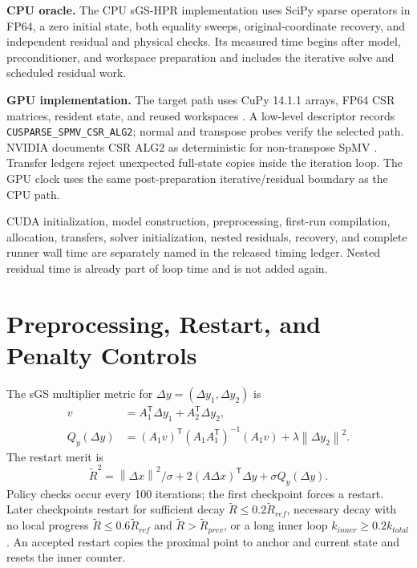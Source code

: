 \documentclass[10pt,journal]{IEEEtran}
\newcommand{\sgshpr}{sGS-HPR}
\newcommand{\norm}[1]{\left\lVert #1\right\rVert}
\begin{document}
\textbf{CPU oracle.} The CPU \sgshpr{} implementation uses SciPy sparse
operators in FP64, a zero initial state, both equality sweeps,
original-coordinate recovery, and independent residual and physical checks.
Its measured time begins after model, preconditioner, and workspace preparation
and includes the iterative solve and scheduled residual work.

\textbf{GPU implementation.} The target path uses CuPy 14.1.1 arrays, FP64 CSR
matrices, resident state, and reused workspaces \cite{okuta2017}. A low-level
descriptor records \texttt{CUSPARSE\_SPMV\_CSR\_ALG2}; normal and transpose
probes verify the selected path. NVIDIA documents CSR ALG2 as deterministic for
non-transpose SpMV \cite{cusparse}. Transfer ledgers reject unexpected
full-state copies inside the iteration loop. The GPU clock uses the same
post-preparation iterative/residual boundary as the CPU path.

CUDA initialization, model construction, preprocessing, first-run compilation,
allocation, transfers, solver initialization, nested residuals, recovery, and
complete runner wall time are separately named in the released timing ledger.
Nested residual time is already part of loop time and is not added again.

\section{Preprocessing, Restart, and Penalty Controls}
\label{app:controls}

The sGS multiplier metric for $\Delta y=(\Delta y_1,\Delta y_2)$ is
\begin{align}
v&=A_1^{\mathsf T}\Delta y_1+A_2^{\mathsf T}\Delta y_2,\\
Q_y(\Delta y)&=(A_1v)^{\mathsf T}
(A_1A_1^{\mathsf T})^{-1}(A_1v)
+\lambda\norm{\Delta y_2}^2.
\end{align}
The restart merit is
\begin{equation}
\widetilde R^2=
\norm{\Delta x}^2/\sigma+
2(A\Delta x)^{\mathsf T}\Delta y+
\sigma Q_y(\Delta y).
\end{equation}
Policy checks occur every 100 iterations; the first checkpoint forces a
restart. Later checkpoints restart for sufficient decay
$\widetilde R\le0.2\widetilde R_{ref}$, necessary decay with no local
progress
$\widetilde R\le0.6\widetilde R_{ref}$ and
$\widetilde R>\widetilde R_{prev}$, or a long inner loop
$k_{inner}\ge0.2k_{total}$. An accepted restart copies the proximal point to
anchor and current state and resets the inner counter.
\end{document}
